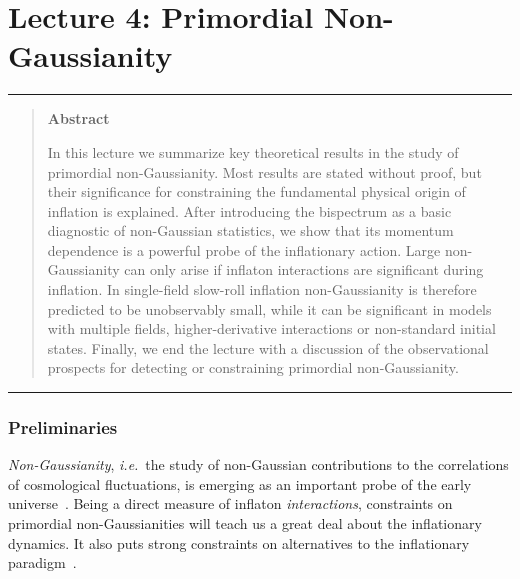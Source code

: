 \documentclass[12pt,letterpaper,rotate]{article}
\begin{document}
{%


\newpage
\part{Lecture 4: Primordial Non-Gaussianity}

\vspace{0.5cm}
 \hrule \vspace{0.3cm}
\begin{quote}
{\bf Abstract}

\noindent
In this lecture we summarize key theoretical results in the study of primordial non-Gaussianity.
Most results are stated without proof, but their significance for constraining the fundamental physical origin of inflation is explained.
After introducing the bispectrum as a basic diagnostic of non-Gaussian statistics, we show that its momentum dependence is a powerful probe of the inflationary action.
Large non-Gaussianity can only arise if inflaton interactions are significant during inflation. In single-field slow-roll inflation non-Gaussianity is therefore predicted to be unobservably small, while it can be significant in models with multiple fields, higher-derivative interactions or non-standard initial states.
Finally, we end the lecture with a discussion of the observational prospects for detecting or constraining primordial non-Gaussianity.

\end{quote}
\vspace{0.1cm}  \hrule
 \vspace{0.5cm}


\section{Preliminaries}

{\it Non-Gaussianity}, {\it i.e.}~the study of non-Gaussian contributions to the correlations of cosmological fluctuations, is emerging as an important probe of the early universe~\cite{Komatsu:2009kd}.  Being a direct measure of inflaton {\it interactions},  constraints on primordial non-Gaussianities will teach us a great deal about the inflationary dynamics.
It also puts strong constraints on alternatives to the inflationary paradigm~\cite{Creminelli:2007aq,Koyama_etal07,Buchbinder_etal07, Lehners:2007wc,Lehners:2008my, Koyama:2007ag, Koyama:2007mg}.


}
\end{document}

